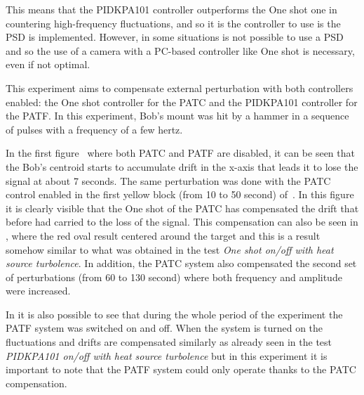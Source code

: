 This means that the PIDKPA101 controller outperforms the One shot one in countering high-frequency fluctuations, and so it is the controller to use is the PSD is implemented. However, in some situations is not possible to use a PSD and so the use of a camera with a PC-based controller like One shot is necessary, even if not optimal.

This experiment aims to compensate external perturbation with both controllers enabled: the One shot controller for the PATC and the PIDKPA101 controller for the PATF.
In this experiment, Bob’s mount was hit by a hammer in a sequence of pulses with a frequency of a few hertz.

In the first figure~ where both PATC and PATF are disabled, it can be seen that the Bob's centroid starts to accumulate drift in the x-axis that leads it to lose the signal at about 7 seconds.
The same perturbation was done with the PATC control enabled in the first yellow block (from 10 to 50 second) of~.
In this figure it is clearly visible that the One shot of the PATC has compensated the drift that before had carried to the loss of the signal. This compensation can also be seen in , where the red oval result centered around the target and this is a result somehow similar to what was obtained in the test \textit{One shot on/off with heat source turbolence}.
In addition, the PATC system also compensated the second set of perturbations (from 60 to 130 second) where both frequency and amplitude were increased.

In  it is also possible to see that during the whole period of the experiment the PATF system was switched on and off.
When the system is turned on the fluctuations and drifts are compensated similarly as already seen in the test \textit{PIDKPA101 on/off with heat source turbolence} but in this experiment it is important to note that the PATF system could only operate thanks to the PATC compensation.

